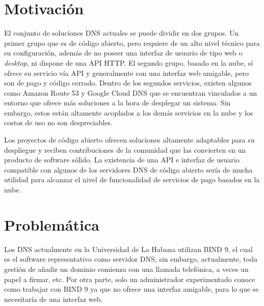 \section{Motivación}

El conjunto de soluciones DNS actuales se puede dividir en dos grupos. Un primer grupo que es de código abierto, pero requiere de un alto nivel técnico para su configuración, además de no poseer una interfaz de usuario de tipo web o \textit{desktop}, ni dispone de una API HTTP. El segundo grupo, basado en la nube, sí ofrece su servicio vía API y generalmente con una interfaz web amigable, pero son de pago y código cerrado. Dentro de los segundos servicios, existen algunos como Amazon Route 53 y Google Cloud DNS que se encuentran vinculados a un entorno que ofrece más soluciones a la hora de desplegar un sistema. Sin embargo, estos están altamente acoplados a los demás servicios en la nube y los costos de uso no son despreciables.

Los proyectos de código abierto ofrecen soluciones altamente adaptables para su despliegue y reciben contribuciones de la comunidad que las convierten en un producto  de software sólido. La existencia de una API e interfaz de usuario compatible con algunos de los servidores DNS de código abierto sería de mucha utilidad para alcanzar el nivel de funcionalidad de servicios de pago basados en la nube.



\section{Problemática}

Los DNS actualmente en la Universidad de La Habana utilizan BIND 9, el cual es el software representativo como servidor DNS, sin embargo, actualmente, toda gestión de añadir un dominio comienza con una llamada telefónica, a veces un papel a firmar, etc. Por otra parte, solo un administrador experimentado conoce como trabajar con BIND 9 ya que no ofrece una interfaz amigable, para lo que se necesitaría de una interfaz web.



